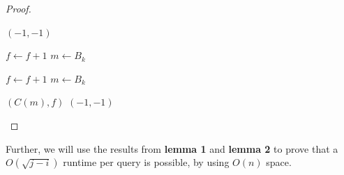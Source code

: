 \documentclass[runningheads]{llncs}
\begin{document}
\begin{proof}
\begin{algorithm}[H]
\begin{algorithmic}[1]
                \Return $(-1,-1)$
            \EndIf
            

                    \State $f\gets f+1$
                    \State $m\gets B_k$
                \EndWhile
            \EndFor
            
                    \State $f\gets f+1$
                    \State $m\gets B_k$
                \EndWhile
            \EndFor
            
            \Return $(C(m),f)$
            \Else{}
            \Return $(-1,-1)$
            \EndIf
        
            \EndFunction
            \end{algorithmic}
        \end{algorithm}

\end{proof}

Further, we will use the results from \textbf{lemma 1} and \textbf{lemma 2} to prove that a $O(\sqrt{j-i})$ runtime per query is possible, by using $O(n)$ space.
\end{document}
